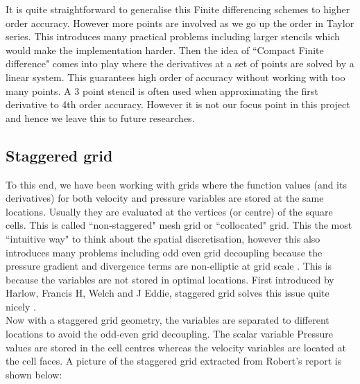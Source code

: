 It is quite straightforward to generalise this Finite differencing schemes to higher order accuracy. However more points are involved as we go up the order in Taylor series. This introduces many practical problems including larger stencils which would make the implementation harder. Then the idea of ``Compact Finite difference" comes into play where the derivatives at a set of points are solved by a linear system. This guarantees high order of accuracy without working with too many points. A 3 point stencil is often used when approximating the first derivative to 4th order accuracy. However it is not our focus point in this project and hence we leave this to future researches.

\subsection{Staggered grid}
To this end, we have been working with grids where the function values (and its derivatives) for both velocity and pressure variables are stored at the same locations. Usually they are evaluated at the vertices (or centre) of the square cells. This is called ``non-staggered" mesh grid or ``collocated" grid. This the most ``intuitive way" to think about the spatial discretisation, however this also introduces many problems including odd even grid decoupling because the pressure gradient and divergence terms are non-elliptic at grid scale \cite{armfield2000fractional}. This is because the variables are not stored in optimal locations. First introduced by Harlow, Francis H, Welch and J Eddie, staggered grid solves this issue quite nicely \cite{harlow1965numerical}.\\

Now with a staggered grid geometry, the variables are separated to different locations to avoid the odd-even grid decoupling. The scalar variable Pressure values are stored in the cell centres whereas the velocity variables are located at the cell faces. A picture of the staggered grid extracted from Robert's report is shown below:

